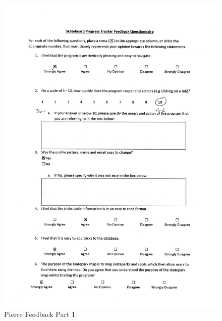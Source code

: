 \begin{figure}[H]
    \includegraphics[width=\textwidth]{./Evaluation/images/PierreFeedback1.pdf}
    \caption{Pierre Feedback Part 1} \label{fig:PierreFeedback1}
\end{figure}

